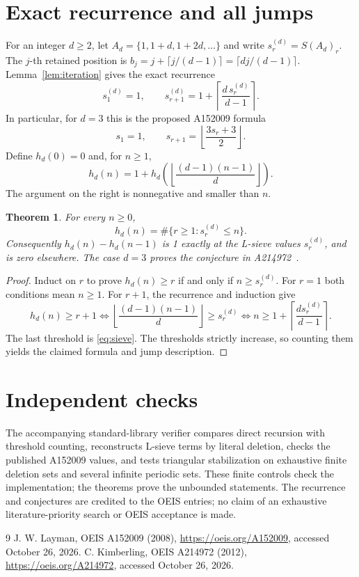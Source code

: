 \documentclass[10pt]{article}
\newtheorem{theorem}{Theorem}
\begin{document}
\section{Exact recurrence and all jumps}
For an integer $d\ge2$, let $A_d=\{1,1+d,1+2d,\ldots\}$ and write
$s^{(d)}_r=S(A_d)_r$. The $j$-th retained position is
$b_j=j+\lceil j/(d-1)\rceil=\lceil dj/(d-1)\rceil$.
Lemma~\ref{lem:iteration} gives the exact recurrence
\begin{equation}\label{eq:sieve}
 s^{(d)}_1=1,\qquad
 s^{(d)}_{r+1}=1+\left\lceil\frac{d\,s^{(d)}_r}{d-1}\right\rceil.
\end{equation}
In particular, for $d=3$ this is the proposed A152009 formula
\[
 s_1=1,\qquad s_{r+1}=\left\lfloor\frac{3s_r+3}{2}\right\rfloor.
\]
Define $h_d(0)=0$ and, for $n\ge1$,
\[
 h_d(n)=1+h_d\!\left(\left\lfloor\frac{(d-1)(n-1)}d\right\rfloor\right).
\]
The argument on the right is nonnegative and smaller than $n$.
\begin{theorem}\label{thm:jumps}
For every $n\ge0$,
\[
 h_d(n)=\#\{r\ge1:s^{(d)}_r\le n\}.
\]
Consequently $h_d(n)-h_d(n-1)$ is 1 exactly at the L-sieve values
$s^{(d)}_r$, and is zero elsewhere. The case $d=3$ proves the conjecture
in A214972~\cite{oeis214}.
\end{theorem}
\begin{proof}
Induct on $r$ to prove $h_d(n)\ge r$ if and only if $n\ge s^{(d)}_r$.
For $r=1$ both conditions mean $n\ge1$. For $r+1$, the recurrence and
induction give
\[
 h_d(n)\ge r+1\iff
 \left\lfloor\frac{(d-1)(n-1)}d\right\rfloor\ge s^{(d)}_r
 \iff n\ge1+\left\lceil\frac{d s^{(d)}_r}{d-1}\right\rceil.
\]
The last threshold is \eqref{eq:sieve}. The thresholds strictly increase,
so counting them yields the claimed formula and jump description.
\end{proof}

\section{Independent checks}
The accompanying standard-library verifier compares direct recursion with
threshold counting, reconstructs L-sieve terms by literal deletion, checks the
published A152009 values, and tests triangular stabilization on exhaustive
finite deletion sets and several infinite periodic sets. These finite controls
check the implementation; the theorems prove the unbounded statements.
The recurrence and conjectures are credited to the OEIS entries; no claim of
an exhaustive literature-priority search or OEIS acceptance is made.
\begin{thebibliography}{9}
 J. W. Layman, OEIS A152009 (2008),
\url{https://oeis.org/A152009}, accessed October 26, 2026.
 C. Kimberling, OEIS A214972 (2012),
\url{https://oeis.org/A214972}, accessed October 26, 2026.
\end{thebibliography}
\end{document}
